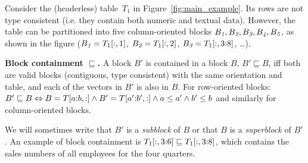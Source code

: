 

\begin{example}
Consider the (headerless) table~$T_1$ in Figure~\ref{fig:main_example}.
Its rows are not type consistent (i.e. they contain both numeric and textual data).
However, the table can be partitioned into five column-oriented blocks $B_{\textit{1}}, B_{\textit{2}}, B_{\textit{3}}, B_{\textit{4}}, B_{\textit{5}}$, as shown in the figure ($B_{\textit{1}} = T_1[:,1]$, $B_{\textit{2}} = T_1[:,2]$, $B_{\textit{3}} = T_1[:,3{:}8]$, \dots).
\end{example}

\begin{definition}
\textbf{Block containment $\sqsubseteq$.} 
A block $B'$ is contained in a block $B$, $B' \sqsubseteq B$, iff both are valid blocks (contiguous, type consistent) with the same orientation and table, and each of the vectors in $B'$ is also in $B$. For row-oriented blocks: $B' \sqsubseteq B \Leftrightarrow B=T[a{:}b,:] \wedge B'=T[a'{:}b',:] \wedge a \leq a' \wedge b' \leq b$ and similarly for column-oriented blocks.
\end{definition}

We will sometimes write that $B'$ is a \textit{subblock} of $B$ or that $B$ is a \textit{superblock} of $B'$.
%
An example of block containment is $T_1[:,3{:}6] \sqsubseteq T_1[:,3{:}8] $, which contains the sales numbers of all employees for the four quarters.


